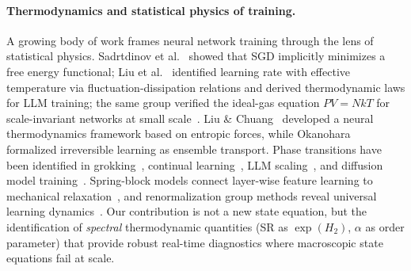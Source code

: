 \paragraph{Thermodynamics and statistical physics of training.}
A growing body of work frames neural network training through the lens of statistical physics.
Sadrtdinov et al.~\citep{sadrtdinov2025} showed that SGD implicitly minimizes a free energy functional; Liu et al.~\citep{liu_tegmark2025} identified learning rate with effective temperature via fluctuation-dissipation relations and derived thermodynamic laws for LLM training; the same group verified the ideal-gas equation $PV\!=\!NkT$ for scale-invariant networks at small scale~\citep{pvnkt_ijcai2026}.
Liu \& Chuang~\citep{liu_ziyin_neurips2025} developed a neural thermodynamics framework based on entropic forces, while Okanohara~\citep{okanohara2026} formalized irreversible learning as ensemble transport.
Phase transitions have been identified in grokking~\citep{grokking_glass_neurips2025, grokking_pretraining2025}, continual learning~\citep{order_params_cl2024}, LLM scaling~\citep{phase_transitions_on_model}, and diffusion model training~\citep{biroli_mezard2025_diffusion}.
Spring-block models connect layer-wise feature learning to mechanical relaxation~\citep{spring_block_prl2025}, and renormalization group methods reveal universal learning dynamics~\citep{rg_for_dnns2025}.
Our contribution is not a new state equation, but the identification of \emph{spectral} thermodynamic quantities (SR as $\exp(H_2)$, $\alpha$ as order parameter) that provide robust real-time diagnostics where macroscopic state equations fail at scale.

